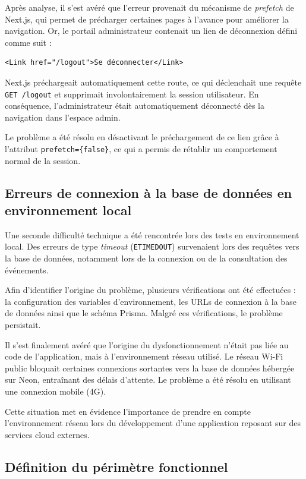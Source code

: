 \documentclass{article}
\begin{document}
Après analyse, il s'est avéré que l'erreur provenait du mécanisme de 
\textit{prefetch} de Next.js, qui permet de précharger certaines pages à 
l'avance pour améliorer la navigation. Or, le portail administrateur 
contenait un lien de déconnexion défini comme suit :

\begin{verbatim}
<Link href="/logout">Se déconnecter</Link>
\end{verbatim}

Next.js préchargeait automatiquement cette route, ce qui déclenchait une 
requête \texttt{GET /logout} et supprimait involontairement la session 
utilisateur. En conséquence, l'administrateur était automatiquement 
déconnecté dès la navigation dans l'espace admin.

Le problème a été résolu en désactivant le préchargement de ce lien grâce 
à l'attribut \texttt{prefetch=\{false\}}, ce qui a permis de rétablir un 
comportement normal de la session.

\subsection{Erreurs de connexion à la base de données en environnement local}

Une seconde difficulté technique a été rencontrée lors des tests en 
environnement local. Des erreurs de type \textit{timeout} (\texttt{ETIMEDOUT}) 
survenaient lors des requêtes vers la base de données, notamment lors de 
la connexion ou de la consultation des événements.

Afin d'identifier l'origine du problème, plusieurs vérifications ont été 
effectuées : la configuration des variables d'environnement, les URLs de 
connexion à la base de données ainsi que le schéma Prisma. Malgré ces 
vérifications, le problème persistait.

Il s'est finalement avéré que l'origine du dysfonctionnement n'était pas 
liée au code de l'application, mais à l'environnement réseau utilisé. Le 
réseau Wi-Fi public bloquait certaines connexions sortantes vers la base 
de données hébergée sur Neon, entraînant des délais d'attente. Le problème 
a été résolu en utilisant une connexion mobile (4G).

Cette situation met en évidence l'importance de prendre en compte 
l'environnement réseau lors du développement d'une application reposant 
sur des services cloud externes.

\subsection{Définition du périmètre fonctionnel}
\end{document}
